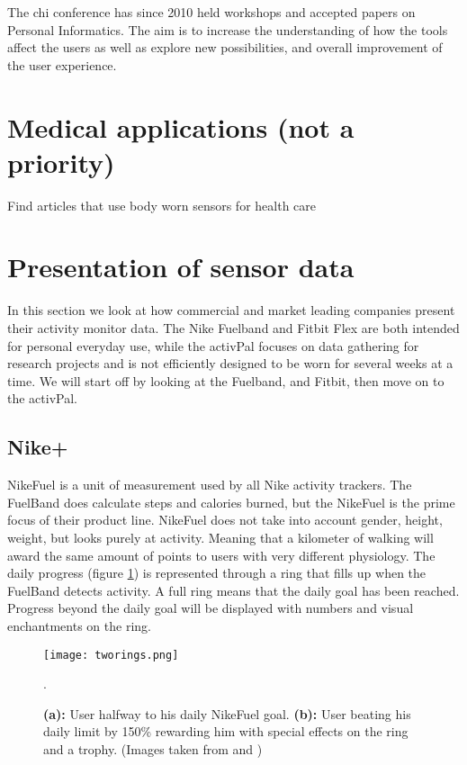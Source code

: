 The \gls{chi} conference has since 2010 \cite{chi2010} held workshops and accepted papers on Personal Informatics. The aim is to increase the understanding of how the tools affect the users as well as explore new possibilities, and overall improvement of the user experience.

\section{Medical applications (not a priority)}
Find articles that use body worn sensors for health care

\section{Presentation of sensor data}
In this section we look at how commercial and market leading companies present their activity monitor data. The Nike Fuelband and Fitbit Flex are both intended for personal everyday use, while the activPal focuses on data gathering for research projects and is not efficiently designed to be worn for several weeks at a time. We will start off by looking at the Fuelband, and Fitbit, then move on to the activPal.

\subsection{Nike+}
NikeFuel \cite{nikefuel} is a unit of measurement used by all Nike activity trackers. The FuelBand does calculate steps and calories burned, but the NikeFuel is the prime focus of their product line. NikeFuel does not take into account gender, height, weight, but looks purely at activity. Meaning that a kilometer of walking will award the same amount of points to users with very different physiology. The daily progress (figure \ref{fig:tworings}) is represented through a ring that fills up when the FuelBand detects activity. A full ring means that the daily goal has been reached. Progress beyond the daily goal will be displayed with numbers and visual enchantments on the ring. 

\begin{figure}[h!]
	\centering
		\texttt{[image: tworings.png]}
		\caption{\footnotesize \textbf{(a):} User halfway to his daily NikeFuel goal. \textbf{(b):} User beating his daily limit by 150\% rewarding him with special effects on the ring and a trophy. (Images taken from \cite{fuelbandDcRain} and \cite{fuelbandTechSpce})}.
		\label{fig:tworings}
\end{figure}

